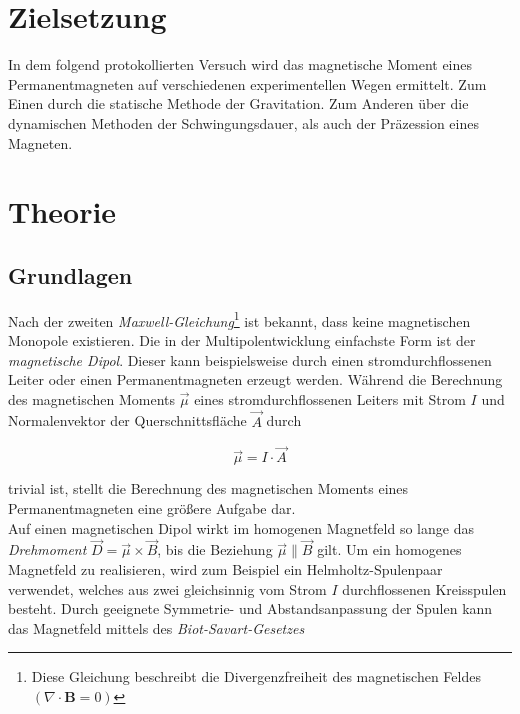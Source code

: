%

%

\section{Zielsetzung}
\label{sec:Zielsetzung}

In dem folgend protokollierten Versuch wird das magnetische Moment eines Permanentmagneten auf verschiedenen 
experimentellen Wegen ermittelt. Zum Einen durch die statische Methode der Gravitation. Zum Anderen über die 
dynamischen Methoden der Schwingungsdauer, als auch der Präzession eines Magneten.

\section{Theorie}
\label{sec:Theorie}

\subsection{Grundlagen}
Nach der zweiten \emph{Maxwell-Gleichung}\footnote{Diese Gleichung beschreibt die Divergenzfreiheit des magnetischen Feldes
$\left(\nabla \cdot \symbf{B} = 0\right)$} ist bekannt, dass keine magnetischen Monopole existieren. Die in der 
Multipolentwicklung einfachste Form ist der \emph{magnetische Dipol}. Dieser kann beispielsweise durch einen stromdurchflossenen 
Leiter oder einen Permanentmagneten erzeugt werden. Während die Berechnung des magnetischen Moments $\vec{\mu}$ eines 
stromdurchflossenen Leiters mit Strom $I$ und Normalenvektor der Querschnittsfläche $\vec{A}$ durch 

\begin{equation*}
    \vec{\mu} = I \cdot \vec{A}
\end{equation*}

\noindent trivial ist, stellt die Berechnung des magnetischen Moments eines Permanentmagneten eine größere Aufgabe dar.\\
\noindent Auf einen magnetischen Dipol wirkt im homogenen Magnetfeld so lange das \emph{Drehmoment} $\vec{D} = \vec{\mu} \times \vec{B}\label{eqn:D_B}$,
bis die Beziehung $\vec{\mu} \parallel \vec{B}$ gilt. Um ein homogenes Magnetfeld zu realisieren, wird zum Beispiel ein 
Helmholtz-Spulenpaar verwendet, welches aus zwei gleichsinnig vom Strom $I$ durchflossenen Kreisspulen besteht. Durch geeignete 
Symmetrie- und Abstandsanpassung der Spulen kann das Magnetfeld mittels des \emph{Biot-Savart-Gesetzes}

